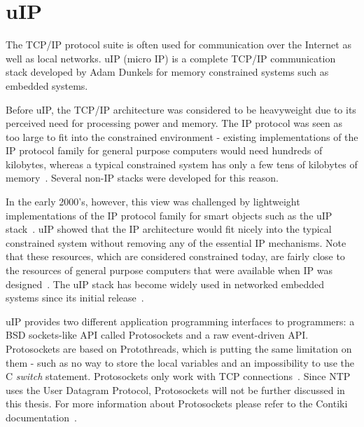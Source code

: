 
\section{uIP}\label{sec:contiki-uip}
The TCP/IP protocol suite is often used for communication over the Internet as well as local networks.
uIP (micro IP) is a complete TCP/IP communication stack developed by Adam Dunkels
for memory constrained systems such as embedded systems.

Before uIP, the TCP/IP architecture was considered to be heavyweight
due to its perceived need for processing power and memory.
The IP protocol was seen as too large to fit into the constrained environment -
existing implementations of the IP protocol family for general purpose computers would need hundreds
of kilobytes, whereas a typical constrained system has only a few tens of kilobytes of memory~\cite{interconnecting}. %
Several non-IP stacks were developed for this reason.

In the early 2000's, however, this view was challenged by lightweight implementations of the IP
protocol family for smart objects such as the uIP stack~\cite{interconnecting}.
uIP showed that the IP architecture would fit nicely into the typical constrained system
without removing any of the essential IP mechanisms.
Note that these resources, which are considered constrained today, are fairly close to the
resources of general purpose computers that were available when IP was designed~\cite{interconnecting}.
The uIP stack has become widely used in networked embedded systems
since its initial release~\cite{interconnecting, thesis-programming}.

uIP provides two different application programming interfaces to programmers:
a BSD sockets-like API called Protosockets and a raw event-driven API.
Protosockets are based on Protothreads, which is putting the same limitation on them - such as %
no way to store the local variables and an impossibility to use the C {\it switch} statement.
Protosockets only work with TCP connections~\cite{contiki-docs}.
Since NTP uses the User Datagram Protocol, Protosockets will not be further
discussed in this thesis. For more information about Protosockets
please refer to the Contiki documentation~\cite{contiki-docs}.

